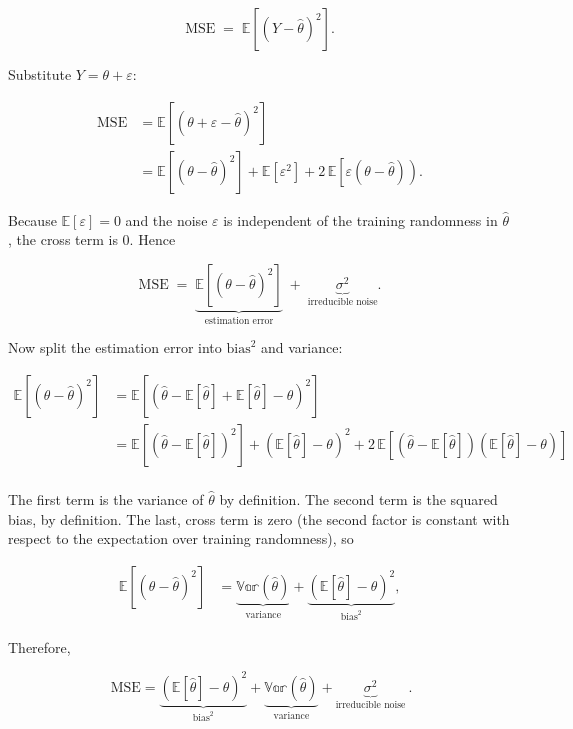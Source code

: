 $$\mathrm{MSE} \;=\; \mathbb{E}\!\left[(Y - \hat \theta)^2\right].$$

Substitute $Y=\theta+\varepsilon$:

$$\begin{aligned}
\mathrm{MSE}
&= \mathbb{E}\!\left[(\theta+\varepsilon-\hat \theta)^2\right] \\
&= \mathbb{E}\!\left[(\theta-\hat \theta)^2\right] + \mathbb{E}[\varepsilon^2] + 2\,\mathbb{E}\!\left[\varepsilon\left(\theta-\hat \theta\right)\right).
\end{aligned}$$

Because $\mathbb{E}[\varepsilon]=0$ and the noise $\varepsilon$ is independent of the training randomness in $\hat \theta$, the cross term is $0$. Hence

$$\mathrm{MSE} \;=\; \underbrace{\mathbb{E}\!\left[(\theta-\hat \theta)^2\right]}_{\text{estimation error}}
\;+\; \underbrace{\sigma^2}_{\text{irreducible noise}}.$$

Now split the estimation error into $\mathrm{bias}^2$ and variance:

$$\begin{aligned}
\mathbb{E}\!\left[(\theta-\hat \theta)^2\right]
&= \mathbb{E}\!\left[(\hat \theta-\mathbb{E}[\hat \theta] + \mathbb{E}[\hat \theta]-\theta)^2\right] \\
&= \mathbb{E}\!\left[(\hat \theta-\mathbb{E}[\hat \theta])^2\right] + (\mathbb{E}[\hat \theta]-\theta)^2 + 2\,\mathbb{E}\!\left[(\hat \theta-\mathbb{E}[\hat \theta])(\mathbb{E}[\hat \theta]-\theta)\right] \\
\end{aligned}$$

The first term is the variance of $\hat{\theta}$ by definition. The second term is the squared bias, by definition. The last, cross term is zero (the second factor is constant with respect to the expectation over training randomness), so

$$\begin{aligned}
\mathbb{E}\!\left[(\theta-\hat \theta)^2\right] &= \underbrace{\mathbb{Var}(\hat \theta)}_{\text{variance}} + \underbrace{(\mathbb{E}[\hat \theta]-\theta)^2}_{\text{bias}^2},
\end{aligned}$$

Therefore,

$$\boxed{\ \mathrm{MSE} = \underbrace{(\mathbb{E}[\hat \theta]-\theta)^2}_{\text{bias}^2} + \underbrace{\mathbb{Var}(\hat \theta)}_{\text{variance}} + \underbrace{\sigma^2}_{\text{irreducible noise}}\ }.$$


